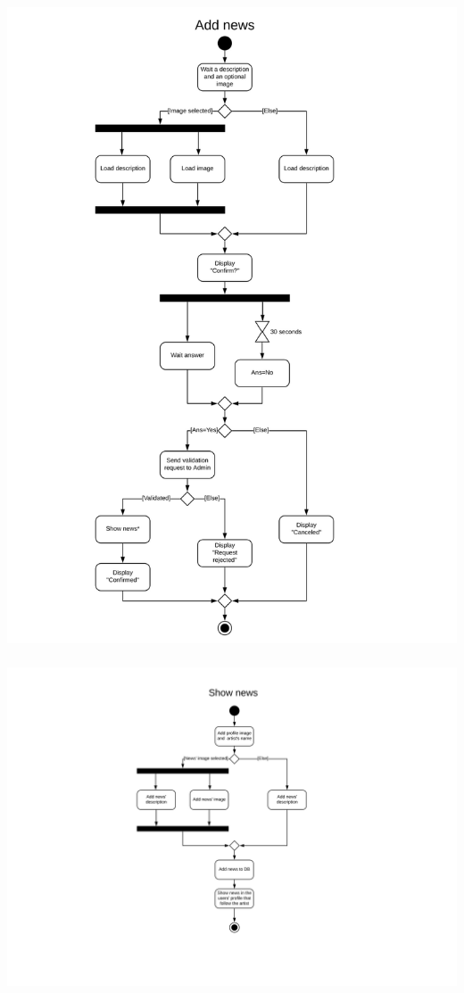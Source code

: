 \documentclass[11pt,a4paper]{article}
\begin{document}
\subsubsection{}
\includegraphics[scale=0.2]{AD1Ferri.jpg}
\subsubsection{}
\includegraphics[scale=0.2]{AD2Ferri.jpg}
\end{document}
